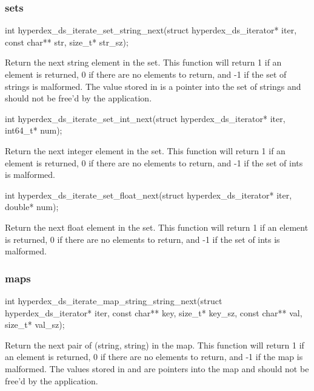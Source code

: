 \subsubsection{sets}

\begin{ccode}
int hyperdex_ds_iterate_set_string_next(struct hyperdex_ds_iterator* iter,
                                        const char** str, size_t* str_sz);
\end{ccode}
\funcdesc Return the next string element in the set.  This function will return
1 if an element is returned, 0 if there are no elements to return, and -1 if the
set of strings is malformed.  The value stored in  is a pointer into
the set of strings and should not be free'd by the application.

\funcsep
\begin{ccode}
int hyperdex_ds_iterate_set_int_next(struct hyperdex_ds_iterator* iter, int64_t* num);
\end{ccode}
\funcdesc Return the next integer element in the set.  This function will return
1 if an element is returned, 0 if there are no elements to return, and -1 if the
set of ints is malformed.

\funcsep
\begin{ccode}
int hyperdex_ds_iterate_set_float_next(struct hyperdex_ds_iterator* iter, double* num);
\end{ccode}
\funcdesc Return the next float element in the set.  This function will return 1
if an element is returned, 0 if there are no elements to return, and -1 if the
set of ints is malformed.

\subsubsection{maps}

\begin{ccode}
int hyperdex_ds_iterate_map_string_string_next(struct hyperdex_ds_iterator* iter,
                                               const char** key, size_t* key_sz,
                                               const char** val, size_t* val_sz);
\end{ccode}
\funcdesc Return the next pair of (string, string) in the map.  This function
will return 1 if an element is returned, 0 if there are no elements to return,
and -1 if the map is malformed.  The values stored in  and
 are pointers into the map and should not be free'd by the
application.

